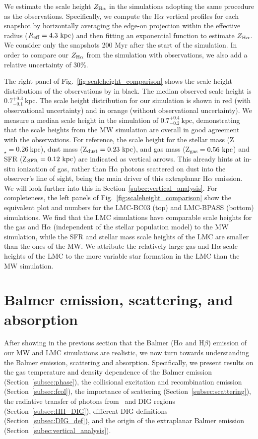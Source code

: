 \documentclass[fleqn,usenatbib]{mnras}
\newcommand\HII{\ion{H}{II}~} %
\begin{document}
We estimate the scale height $Z_{\rm H\alpha}$ in the simulations adopting the same procedure as the observations. Specifically, we compute the H$\alpha$ vertical profiles for each snapshot by horizontally averaging the edge-on projection within the effective radius ($R_{\rm eff}=4.3~\mathrm{kpc}$) and then fitting an exponential function to estimate $Z_{\rm H\alpha}$. We consider only the snapshots 200 Myr after the start of the simulation. In order to compare our $Z_{\rm H\alpha}$ from the simulation with observations, we also add a relative uncertainty of 30\%.

The right panel of Fig.~\ref{fig:scaleheight_comparison} shows the scale height distributions of the observations by \citet{jo18} in black. The median observed scale height is $0.7_{-0.1}^{+0.3}~\mathrm{kpc}$. The scale height distribution for our simulation is shown in red (with observational uncertainty) and in orange (without observational uncertainty). We measure a median scale height in the simulation of $0.7_{-0.2}^{+0.4}~\mathrm{kpc}$, demonstrating that the scale heights from the MW simulation are overall in good agreement with the observations. For reference, the scale height for the stellar mass (Z$_{\star}=0.26~\mathrm{kpc}$), dust mass (Z$_{\rm dust}=0.23~\mathrm{kpc}$), and gas mass (Z$_{\rm gas}=0.56~\mathrm{kpc}$) and SFR (Z$_{\rm SFR}=0.12~\mathrm{kpc}$) are indicated as vertical arrows. This already hints at in-situ ionization of gas, rather than H$\alpha$ photons scattered on dust into the observer's line of sight, being the main driver of this extraplanar H$\alpha$ emission. We will look further into this in Section~\ref{subec:vertical_analysis}. For completeness, the left panels of Fig.~\ref{fig:scaleheight_comparison} show the equivalent plot and numbers for the LMC-BC03 (top) and LMC-BPASS (bottom) simulations. We find that the LMC simulations have comparable scale heights for the gas and H$\alpha$ (independent of the stellar population model) to the MW simulation, while the SFR and stellar mass scale heights of the LMC are smaller than the ones of the MW. We attribute the relatively large gas and H$\alpha$ scale heights of the LMC to the more variable star formation in the LMC than the MW simulation.


\section{Balmer emission, scattering, and absorption}
\label{sec:balmer_emission_diag}

After showing in the previous section that the Balmer (H$\alpha$ and H$\beta$) emission of our MW and LMC simulations are realistic, we now turn towards understanding the Balmer emission, scattering and absorption. Specifically, we present results on the gas temperature and density dependence of the Balmer emission (Section~\ref{subsec:phase}), the collisional excitation and recombination emission (Section~\ref{subsec:fcol}), the importance of scattering (Section~\ref{subsec:scattering}), the radiative transfer of photons from \HII and DIG regions (Section~\ref{subsec:HII_DIG}), different DIG definitions (Section~\ref{subsec:DIG_def}), and the origin of the extraplanar Balmer emission (Section~\ref{subec:vertical_analysis}). 
\end{document}
